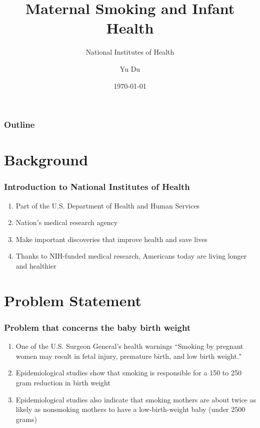 \documentclass[compress,handout,10pt]{beamer}
\title{{\color{blue} \LARGE Maternal Smoking and Infant Health\newline} }
\subtitle{{\color{red} \large National Institutes of Health} }
\author{ 
    {Yu Du} \\ 
    \vspace{5pt}
}
\institute{Johns Hopkins University}
\date{\mygreen \today}
\let\olditem\item
\renewcommand{\item}{\setlength{\itemsep}{0.5\baselineskip}\olditem}
\begin{document}
\begin{frame}[plain]
    \titlepage
\end{frame}

\begin{frame}
    \frametitle{Outline}
    \tableofcontents
\end{frame}

\section{Background}

\begin{frame}
    \frametitle{Introduction to National Institutes of Health}
    \vspace{7pt}
             \begin{enumerate}
                 \item Part of the U.S. Department of Health and Human Services
                 \item Nation$'$s medical research agency
                 \item Make important discoveries that improve health and save lives
                 \item Thanks to NIH-funded medical research, Americans today are living longer and healthier 
             \end{enumerate}
\end{frame}

\section{Problem Statement}
\begin{frame}
    \frametitle{Problem that concerns the baby birth weight}
     \begin{enumerate}
         \item One of the U.S. Surgeon General’s health warnings ``Smoking by pregnant women may result in fetal injury, premature birth, and low birth weight."
         \item Epidemiological studies show that smoking is responsible for a 150 to 250 gram reduction in birth weight 
         \item Epidemiological studies also indicate that smoking mothers are about twice as likely as nonsmoking mothers to have a low-birth-weight baby (under 2500 grams)

     \end{enumerate}
\end{frame}
\end{document}
